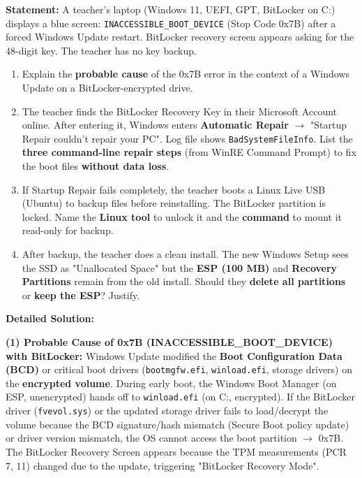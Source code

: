 \documentclass[11pt]{article}
\begin{document}
\begin{exoresolu}
\textbf{Statement:} A teacher's laptop (Windows 11, UEFI, GPT, BitLocker on C:) displays a blue screen: \texttt{INACCESSIBLE\_BOOT\_DEVICE} (Stop Code 0x7B) after a forced Windows Update restart. BitLocker recovery screen appears asking for the 48-digit key. The teacher has no key backup.
\begin{enumerate}
    \item Explain the \textbf{probable cause} of the 0x7B error in the context of a Windows Update on a BitLocker-encrypted drive.
    \item The teacher finds the BitLocker Recovery Key in their Microsoft Account online. After entering it, Windows enters \textbf{Automatic Repair} $\rightarrow$ "Startup Repair couldn't repair your PC". Log file shows \texttt{BadSystemFileInfo}. List the \textbf{three command-line repair steps} (from WinRE Command Prompt) to fix the boot files \textbf{without data loss}.
    \item If Startup Repair fails completely, the teacher boots a Linux Live USB (Ubuntu) to backup files before reinstalling. The BitLocker partition is locked. Name the \textbf{Linux tool} to unlock it and the \textbf{command} to mount it read-only for backup.
    \item After backup, the teacher does a clean install. The new Windows Setup sees the SSD as "Unallocated Space" but the \textbf{ESP (100 MB)} and \textbf{Recovery Partitions} remain from the old install. Should they \textbf{delete all partitions} or \textbf{keep the ESP}? Justify.
\end{enumerate}
\tcblower
\textbf{Detailed Solution:}

\noindent\textbf{(1) Probable Cause of 0x7B (INACCESSIBLE\_BOOT\_DEVICE) with BitLocker:}
Windows Update modified the \textbf{Boot Configuration Data (BCD)} or critical boot drivers (\texttt{bootmgfw.efi}, \texttt{winload.efi}, storage drivers) on the \textbf{encrypted volume}. During early boot, the Windows Boot Manager (on ESP, unencrypted) hands off to \texttt{winload.efi} (on C:, encrypted). If the BitLocker driver (\texttt{fvevol.sys}) or the updated storage driver fails to load/decrypt the volume because the BCD signature/hash mismatch (Secure Boot policy update) or driver version mismatch, the OS cannot access the boot partition $\rightarrow$ 0x7B. The BitLocker Recovery Screen appears because the TPM measurements (PCR 7, 11) changed due to the update, triggering "BitLocker Recovery Mode".


\end{exoresolu}
\end{document}
